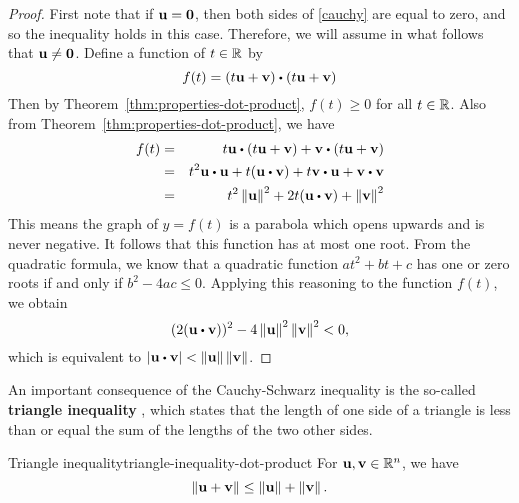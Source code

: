 \begin{proof}
  First note that if $\mbox{\bf u}=\mbox{\bf 0}$, then both sides of
  \eqref{cauchy} are equal to zero, and so the inequality holds in
  this case. Therefore, we will assume in what follows that
  $\mbox{\bf u}\neq \mbox{\bf 0}$.  Define a function of $t\in \mathbb{R}$ by
  \begin{equation*}
    f(t) =(t\vect{u}+\vect{v}) \dotprod (t\vect{u}+
      \vect{v})
  \end{equation*}
  Then by Theorem~\ref{thm:properties-dot-product}, $f(t) \geq 0$
  for all $t\in \mathbb{R}$.  Also from
  Theorem~\ref{thm:properties-dot-product}, we have
  \begin{eqnarray*}
    f(t) &=&t\vect{u}\dotprod (t\vect{u}+\vect{v}) +
                 \vect{v}\dotprod (t\vect{u}+\vect{v}) \\
             &=&t^2\vect{u}\dotprod \vect{u}+t(\vect{u}\dotprod \vect{v}) + t \vect{v}\dotprod \vect{u}+
                 \vect{v}\dotprod \vect{v} \\
             &=&t^2\norm{\vect{u}}^{2}+2t(\vect{u}\dotprod \vect{v}) +\norm{
                 \vect{v}} ^{2}
  \end{eqnarray*}
  This means the graph of $y=f(t)$ is a parabola which opens upwards
  and is never negative. It follows that this function has at most one
  root. From the quadratic formula, we know that a quadratic function
  $at^2+bt+c$ has one or zero roots if and only if $b^2-4ac\leq
  0$. Applying this reasoning to the function $f(t)$, we obtain
  \begin{equation*}
    (2(\vect{u}\dotprod \vect{v})) ^{2}-4\norm{\vect{u}
    } ^{2}\norm{\vect{v}} ^{2}<0,
  \end{equation*}
  which is equivalent to
  $\abs{\vect{u}\dotprod \vect{v} }<\norm{\vect{u}} \norm{\vect{v}}$.
\end{proof}

An important consequence of the Cauchy-Schwarz inequality is the
so-called \textbf{triangle inequality}%
, which states that the length
of one side of a triangle is less than or equal the sum of the lengths
of the two other sides.

\begin{theorem}{Triangle inequality}{triangle-inequality-dot-product}
  For\/ $\mbox{\bf u},\mbox{\bf v}\in \mathbb{R}^{n}$, we have
  \begin{equation}\label{triangle-ineq-1}
    \left\|\mbox{\bf u}+\mbox{\bf v}\right\| \leq \left\|\mbox{\bf u}\right\| +\left\|\mbox{\bf v}\right\|.
  \end{equation}

  \begin{center}
  \end{center}
\end{theorem}

